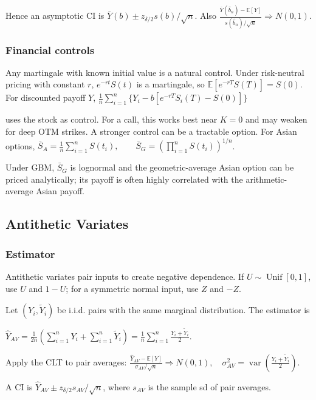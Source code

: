 Hence an asymptotic CI is $\bar{Y}(b)\pm z_{\delta/2}s(b)/\sqrt{n}$. Also
$\frac{\bar{Y}(\hat{b}_n)-\mathbb{E}[Y]}{s(\hat{b}_n)/\sqrt{n}}\Rightarrow N(0,1)$.

\subsubsection*{Financial controls}

Any martingale with known initial value is a natural control. Under risk-neutral pricing with constant $r$, $e^{-rt}S(t)$ is a martingale, so $\mathbb{E}[e^{-rT}S(T)]=S(0)$. For discounted payoff $Y$,
$\frac{1}{n}\sum_{i=1}^n\{Y_i-b[e^{-rT}S_i(T)-S(0)]\}$

uses the stock as control. For a call, this works best near $K=0$ and may weaken for deep OTM strikes. A stronger control can be a tractable option. For Asian options,
$\bar{S}_A=\frac{1}{n}\sum_{i=1}^nS(t_i),\qquad \bar{S}_G=\left(\prod_{i=1}^nS(t_i)\right)^{1/n}$.

Under GBM, $\bar{S}_G$ is lognormal and the geometric-average Asian option can be priced analytically; its payoff is often highly correlated with the arithmetic-average Asian payoff.

\subsection{Antithetic Variates}

\subsubsection*{Estimator}

Antithetic variates pair inputs to create negative dependence. If $U\sim\operatorname{Unif}[0,1]$, use $U$ and $1-U$; for a symmetric normal input, use $Z$ and $-Z$.

Let $(Y_i,\tilde{Y}_i)$ be i.i.d. pairs with the same marginal distribution. The estimator is

$\hat{Y}_{AV}=\frac{1}{2n}\left(\sum_{i=1}^nY_i+\sum_{i=1}^n\tilde{Y}_i\right)=\frac{1}{n}\sum_{i=1}^n\frac{Y_i+\tilde{Y}_i}{2}$.

Apply the CLT to pair averages:
$\frac{\hat{Y}_{AV}-\mathbb{E}[Y]}{\sigma_{AV}/\sqrt{n}}\Rightarrow N(0,1),\quad \sigma_{AV}^2=\operatorname{var}\left(\frac{Y_i+\tilde{Y}_i}{2}\right)$.

A CI is $\hat{Y}_{AV}\pm z_{\delta/2}s_{AV}/\sqrt{n}$, where $s_{AV}$ is the sample sd of pair averages.

